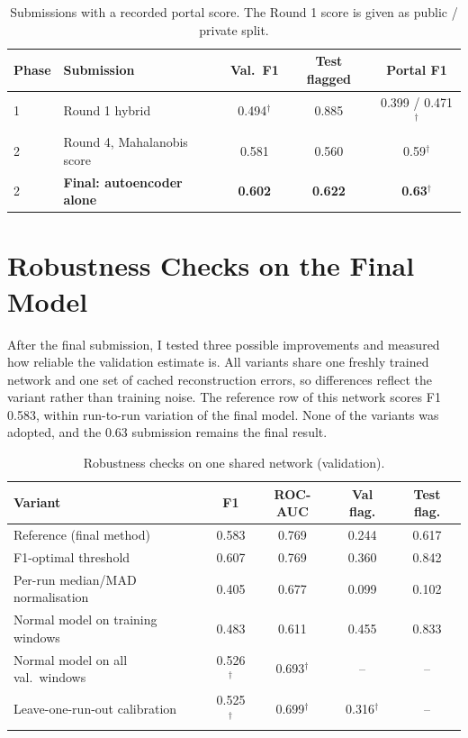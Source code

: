 \documentclass[runningheads]{llncs}
\newcommand{\doc}{$^\dagger$}
\begin{document}
\begin{table}[ht]
\centering
\caption{Submissions with a recorded portal score. The Round 1 score is given as public / private split.}\label{tab:portal}
\begin{tabular}{|l|l|c|c|c|}
\hline
Phase & Submission & Val.\ F1 & Test flagged & Portal F1 \\
\hline
1 & Round 1 hybrid & 0.494\doc & 0.885 & 0.399 / 0.471\doc \\
2 & Round 4, Mahalanobis score & 0.581 & 0.560 & 0.59\doc \\
2 & \textbf{Final: autoencoder alone} & \textbf{0.602} & \textbf{0.622} & \textbf{0.63}\doc \\
\hline
\end{tabular}
\end{table}

\section{Robustness Checks on the Final Model}\label{sec:robust}

After the final submission, I tested three possible improvements and measured how reliable the validation estimate is. All variants share one freshly trained network and one set of cached reconstruction errors, so differences reflect the variant rather than training noise. The reference row of this network scores F1 0.583, within run-to-run variation of the final model. None of the variants was adopted, and the 0.63 submission remains the final result.

\begin{table}[ht]
\centering
\caption{Robustness checks on one shared network (validation).}\label{tab:robust}
\begin{tabular}{|l|c|c|c|c|}
\hline
Variant & F1 & ROC-AUC & Val flag. & Test flag. \\
\hline
Reference (final method) & 0.583 & 0.769 & 0.244 & 0.617 \\
F1-optimal threshold & 0.607 & 0.769 & 0.360 & 0.842 \\
Per-run median/MAD normalisation & 0.405 & 0.677 & 0.099 & 0.102 \\
Normal model on training windows & 0.483 & 0.611 & 0.455 & 0.833 \\
Normal model on all val.\ windows & 0.526\doc & 0.693\doc & -- & -- \\
Leave-one-run-out calibration & 0.525\doc & 0.699\doc & 0.316\doc & -- \\
\hline
\end{tabular}
\end{table}
\end{document}
